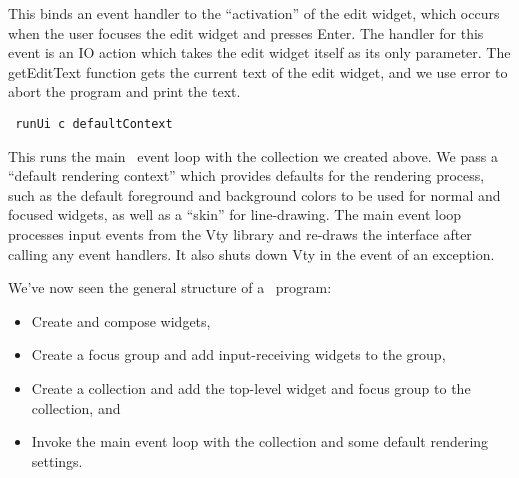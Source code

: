 This binds an event handler to the “activation” of the edit widget,
which occurs when the user focuses the edit widget and presses Enter.
The handler for this event is an IO action which takes the edit widget
itself as its only parameter.  The getEditText function gets the current
text of the edit widget, and we use error to abort the program and print
the text.

\begin{verbatim}
 runUi c defaultContext
\end{verbatim}

This runs the main \vtyui\ event loop with the collection we created
above.  We pass a “default rendering context” which provides defaults
for the rendering process, such as the default foreground and
background colors to be used for normal and focused widgets, as well
as a “skin” for line-drawing.  The main event loop processes input
events from the Vty library and re-draws the interface after calling
any event handlers.  It also shuts down Vty in the event of an
exception.

We've now seen the general structure of a \vtyui\ program:
\begin{itemize}
\item Create and compose widgets,
\item Create a focus group and add input-receiving widgets to the group,
\item Create a collection and add the top-level widget and focus group
      to the collection, and
\item Invoke the main event loop with the collection and some default
      rendering settings.
\end{itemize}
